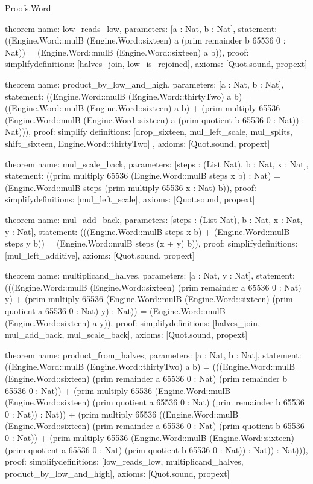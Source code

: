 \begin{lexlean}{Proofs.Word}
\begin{semanticmodule}
theorem{
  name: low_reads_low,
  parameters: [a : Nat, b : Nat],
  statement: ((Engine.Word::mulB (Engine.Word::sixteen) a (prim remainder b 65536 0 : Nat)) = (Engine.Word::mulB (Engine.Word::sixteen) a b)),
  proof: simplify{definitions: [halves_join, low_is_rejoined]},
  axioms: [Quot.sound, propext]
}

theorem{
  name: product_by_low_and_high,
  parameters: [a : Nat, b : Nat],
  statement: ((Engine.Word::mulB (Engine.Word::thirtyTwo) a b) = ((Engine.Word::mulB (Engine.Word::sixteen) a b) + (prim multiply 65536 (Engine.Word::mulB (Engine.Word::sixteen) a (prim quotient b 65536 0 : Nat)) : Nat))),
  proof: simplify{
    definitions: [drop_sixteen, mul_left_scale, mul_splits, shift_sixteen, Engine.Word::thirtyTwo]
  },
  axioms: [Quot.sound, propext]
}

theorem{
  name: mul_scale_back,
  parameters: [steps : (List Nat), b : Nat, x : Nat],
  statement: ((prim multiply 65536 (Engine.Word::mulB steps x b) : Nat) = (Engine.Word::mulB steps (prim multiply 65536 x : Nat) b)),
  proof: simplify{definitions: [mul_left_scale]},
  axioms: [Quot.sound, propext]
}

theorem{
  name: mul_add_back,
  parameters: [steps : (List Nat), b : Nat, x : Nat, y : Nat],
  statement: (((Engine.Word::mulB steps x b) + (Engine.Word::mulB steps y b)) = (Engine.Word::mulB steps (x + y) b)),
  proof: simplify{definitions: [mul_left_additive]},
  axioms: [Quot.sound, propext]
}

theorem{
  name: multiplicand_halves,
  parameters: [a : Nat, y : Nat],
  statement: (((Engine.Word::mulB (Engine.Word::sixteen) (prim remainder a 65536 0 : Nat) y) + (prim multiply 65536 (Engine.Word::mulB (Engine.Word::sixteen) (prim quotient a 65536 0 : Nat) y) : Nat)) = (Engine.Word::mulB (Engine.Word::sixteen) a y)),
  proof: simplify{definitions: [halves_join, mul_add_back, mul_scale_back]},
  axioms: [Quot.sound, propext]
}

theorem{
  name: product_from_halves,
  parameters: [a : Nat, b : Nat],
  statement: ((Engine.Word::mulB (Engine.Word::thirtyTwo) a b) = (((Engine.Word::mulB (Engine.Word::sixteen) (prim remainder a 65536 0 : Nat) (prim remainder b 65536 0 : Nat)) + (prim multiply 65536 (Engine.Word::mulB (Engine.Word::sixteen) (prim quotient a 65536 0 : Nat) (prim remainder b 65536 0 : Nat)) : Nat)) + (prim multiply 65536 ((Engine.Word::mulB (Engine.Word::sixteen) (prim remainder a 65536 0 : Nat) (prim quotient b 65536 0 : Nat)) + (prim multiply 65536 (Engine.Word::mulB (Engine.Word::sixteen) (prim quotient a 65536 0 : Nat) (prim quotient b 65536 0 : Nat)) : Nat)) : Nat))),
  proof: simplify{definitions: [low_reads_low, multiplicand_halves, product_by_low_and_high]},
  axioms: [Quot.sound, propext]
}


\end{semanticmodule}
\end{lexlean}
